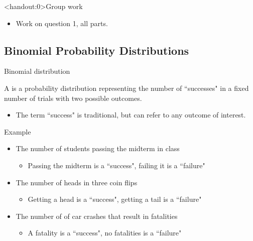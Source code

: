 \documentclass[xcolor=table, handout]{beamer}
\begin{document}
\begin{frame}<handout:0>{Group work}
\begin{block}{}
\large
\begin{itemize}
\item Work on question 1, all parts.
\end{itemize}
\end{block}
\end{frame}






\subsection{Binomial Probability Distributions}

\begin{frame}{Binomial distribution}
\begin{block}{}
{\large A  is a probability distribution representing the number of ``successes" in a fixed number of trials with two possible outcomes. }
\begin{itemize}
\pause\item The term ``success" is traditional, but can refer to any outcome of interest.
\end{itemize}
\end{block}
\pause
\begin{exampleblock}{Example}
\begin{itemize}
\item The number of students passing the midterm in class
\begin{itemize}
\item Passing the midterm is a ``success", failing it is a ``failure"
\end{itemize}
\pause\item The number of heads in three coin flips
\begin{itemize}
\item Getting a head is a ``success", getting a tail is a ``failure"
\end{itemize}
\pause\item The number of of car crashes that result in fatalities
\begin{itemize}
\item A fatality is a ``success", no fatalities is a ``failure"
\end{itemize}

\end{itemize}
\end{exampleblock}
\end{frame}
\end{document}
